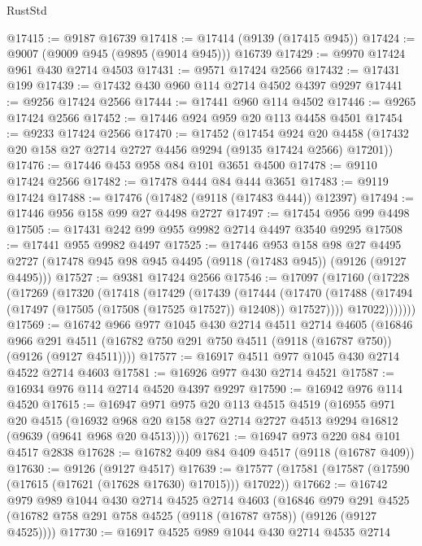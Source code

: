 \begin{lexlean}{RustStd}
\begin{coremodule}
@17415 := @9187 @16739
@17418 := @17414 (@9139 (@17415 @945))
@17424 := @9007 (@9009 @945 (@9895 (@9014 @945))) @16739
@17429 := @9970 @17424 @961 @430 @2714 @4503
@17431 := @9571 @17424 @2566
@17432 := @17431 @199
@17439 := @17432 @430 @960 @114 @2714 @4502 @4397 @9297
@17441 := @9256 @17424 @2566
@17444 := @17441 @960 @114 @4502
@17446 := @9265 @17424 @2566
@17452 := @17446 @924 @959 @20 @113 @4458 @4501
@17454 := @9233 @17424 @2566
@17470 := @17452
    (@17454
      @924
      @20
      @4458
      (@17432 @20 @158 @27 @2714 @2727 @4456 @9294 (@9135 @17424 @2566) @17201))
@17476 := @17446 @453 @958 @84 @101 @3651 @4500
@17478 := @9110 @17424 @2566
@17482 := @17478 @444 @84 @444 @3651
@17483 := @9119 @17424
@17488 := @17476 (@17482 (@9118 (@17483 @444)) @12397)
@17494 := @17446 @956 @158 @99 @27 @4498 @2727
@17497 := @17454 @956 @99 @4498
@17505 := @17431 @242 @99 @955 @9982 @2714 @4497 @3540 @9295
@17508 := @17441 @955 @9982 @4497
@17525 := @17446
    @953
    @158
    @98
    @27
    @4495
    @2727
    (@17478 @945 @98 @945 @4495 (@9118 (@17483 @945)) (@9126 (@9127 @4495)))
@17527 := @9381 @17424 @2566
@17546 := @17097
    (@17160
      (@17228
        (@17269
          (@17320
            (@17418
              (@17429
                (@17439
                  (@17444
                    (@17470
                      (@17488 (@17494 (@17497 (@17505 (@17508 (@17525 @17527)) @12408)) @17527))))
                  @17022)))))))
@17569 := @16742
    @966
    @977
    @1045
    @430
    @2714
    @4511
    @2714
    @4605
    (@16846
      @966
      @291
      @4511
      (@16782 @750 @291 @750 @4511 (@9118 (@16787 @750)) (@9126 (@9127 @4511))))
@17577 := @16917 @4511 @977 @1045 @430 @2714 @4522 @2714 @4603
@17581 := @16926 @977 @430 @2714 @4521
@17587 := @16934 @976 @114 @2714 @4520 @4397 @9297
@17590 := @16942 @976 @114 @4520
@17615 := @16947
    @971
    @975
    @20
    @113
    @4515
    @4519
    (@16955
      @971
      @20
      @4515
      (@16932 @968 @20 @158 @27 @2714 @2727 @4513 @9294 @16812 (@9639 (@9641 @968 @20 @4513))))
@17621 := @16947 @973 @220 @84 @101 @4517 @2838
@17628 := @16782 @409 @84 @409 @4517 (@9118 (@16787 @409))
@17630 := @9126 (@9127 @4517)
@17639 := @17577 (@17581 (@17587 (@17590 (@17615 (@17621 (@17628 @17630) @17015))) @17022))
@17662 := @16742
    @979
    @989
    @1044
    @430
    @2714
    @4525
    @2714
    @4603
    (@16846
      @979
      @291
      @4525
      (@16782 @758 @291 @758 @4525 (@9118 (@16787 @758)) (@9126 (@9127 @4525))))
@17730 := @16917
    @4525
    @989
    @1044
    @430
    @2714
    @4535
    @2714

\end{coremodule}
\end{lexlean}
